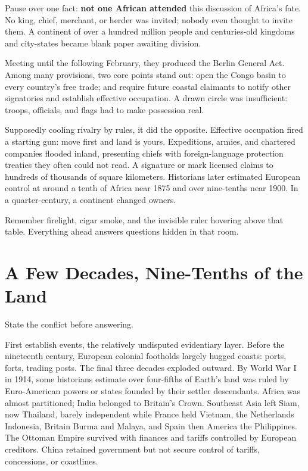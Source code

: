 Pause over one fact: \textbf{not one African attended} this discussion of Africa's fate. No king, chief, merchant, or herder was invited; nobody even thought to invite them. A continent of over a hundred million people and centuries-old kingdoms and city-states became blank paper awaiting division.

Meeting until the following February, they produced the Berlin General Act. Among many provisions, two core points stand out: open the Congo basin to every country's free trade; and require future coastal claimants to notify other signatories and establish effective occupation. A drawn circle was insufficient: troops, officials, and flags had to make possession real.

Supposedly cooling rivalry by rules, it did the opposite. Effective occupation fired a starting gun: move first and land is yours. Expeditions, armies, and chartered companies flooded inland, presenting chiefs with foreign-language protection treaties they often could not read. A signature or mark licensed claims to hundreds of thousands of square kilometers. Historians later estimated European control at around a tenth of Africa near 1875 and over nine-tenths near 1900. In a quarter-century, a continent changed owners.

Remember firelight, cigar smoke, and the invisible ruler hovering above that table. Everything ahead answers questions hidden in that room.

\section{A Few Decades, Nine-Tenths of the Land}
State the conflict before answering.

First establish events, the relatively undisputed evidentiary layer. Before the nineteenth century, European colonial footholds largely hugged coasts: ports, forts, trading posts. The final three decades exploded outward. By World War I in 1914, some historians estimate over four-fifths of Earth's land was ruled by Euro-American powers or states founded by their settler descendants. Africa was almost partitioned; India belonged to Britain's Crown. Southeast Asia left Siam, now Thailand, barely independent while France held Vietnam, the Netherlands Indonesia, Britain Burma and Malaya, and Spain then America the Philippines. The Ottoman Empire survived with finances and tariffs controlled by European creditors. China retained government but not secure control of tariffs, concessions, or coastlines.

